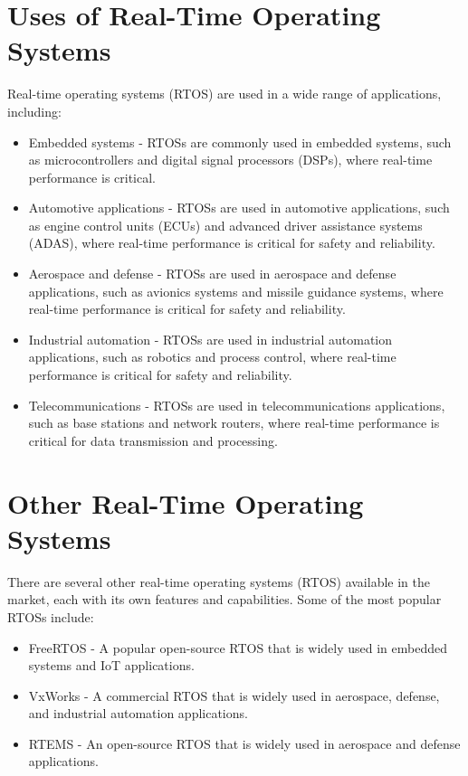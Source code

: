 \documentclass{article}
\begin{document}
\section{Uses of Real-Time Operating Systems}
\label{sec:uses-of-rtos}
Real-time operating systems (RTOS) are used in a wide range of applications, including:
\begin{itemize}
    \item  Embedded systems - RTOSs are commonly used in embedded systems, such as microcontrollers and digital signal processors (DSPs), where real-time performance is critical.
    \item  Automotive applications - RTOSs are used in automotive applications, such as engine control units (ECUs) and advanced driver assistance systems (ADAS), where real-time performance is critical for safety and reliability.
    \item  Aerospace and defense - RTOSs are used in aerospace and defense applications, such as avionics systems and missile guidance systems, where real-time performance is critical for safety and reliability.
    \item  Industrial automation - RTOSs are used in industrial automation applications, such as robotics and process control, where real-time performance is critical for safety and reliability.
    \item  Telecommunications - RTOSs are used in telecommunications applications, such as base stations and network routers, where real-time performance is critical for data transmission and processing.
\end{itemize}
\FloatBarrier

\section{Other Real-Time Operating Systems}
\label{sec:other-rtos}
There are several other real-time operating systems (RTOS) available in the market, each with its own features and capabilities. Some of the most popular RTOSs include:
\begin{itemize}
    \item  FreeRTOS - A popular open-source RTOS that is widely used in embedded systems and IoT applications. \cite{FreeRTOS}
    \item  VxWorks - A commercial RTOS that is widely used in aerospace, defense, and industrial automation applications. \cite{VxWorks}
    \item  RTEMS - An open-source RTOS that is widely used in aerospace and defense applications. \cite{RTEMS}
\end{itemize}
\FloatBarrier
\end{document}
